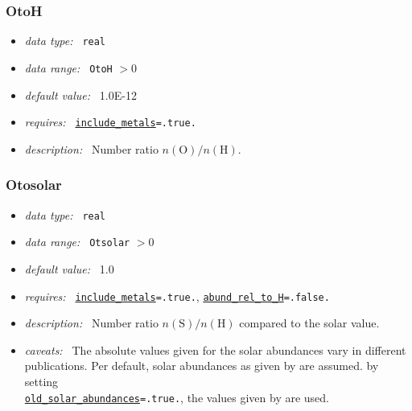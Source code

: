 \documentclass[a4paper,10pt]{article}
\begin{document}
\subsubsection{OtoH}
\label{opt:otoh}
\begin{itemize}
 \item \textit{data type:~} \texttt{real}
 \item \textit{data range:~}  \texttt{OtoH} $> 0$
 \item \textit{default value:~} 1.0E-12
 \item \textit{requires:~} \texttt{\hyperref[opt:abundreltoh]{include\_metals}=.true.}
 \item \textit{description:~} Number ratio $n(\mathrm{O})/n(\mathrm{H})$.
\end{itemize}



\subsubsection{Otosolar}
\label{opt:otosolar}
\begin{itemize}
 \item \textit{data type:~} \texttt{real}
 \item \textit{data range:~}  \texttt{Otsolar} $> 0$
 \item \textit{default value:~} 1.0
 \item \textit{requires:~} \texttt{\hyperref[opt:includemetals]{include\_metals}=.true.},
 \texttt{\hyperref[opt:abundreltoh]{abund\_rel\_to\_H}=.false.}
 \item \textit{description:~} Number ratio $n(\mathrm{S})/n(\mathrm{H})$ 
  compared to the solar value.
 \item \textit{caveats:~} The absolute values given for the solar abundances vary in
  different publications. Per default, solar abundances as given 
  by \cite{Asplund2009} are assumed. by setting \\
  \texttt{\hyperref[opt:oldsolarabundances]{old\_solar\_abundances}=.true.}, 
  the values given by \cite{Grevesse1998} are used.
\end{itemize}
\end{document}
